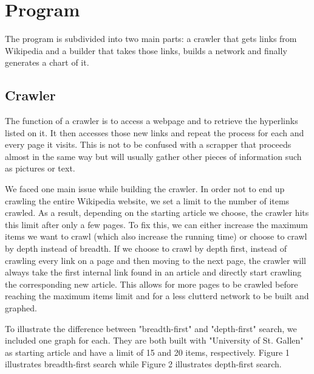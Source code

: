 \documentclass[10pt]{article}
\begin{document}
\section{Program}
The program is subdivided into two main parts: a crawler that gets links from Wikipedia and a builder that takes those links, builds a network and finally generates a chart of it.

	\subsection{Crawler}
	The function of a crawler is to access a webpage and to retrieve the hyperlinks listed on it. It then accesses those new links and repeat the process for each and every page it 	
	visits. This is not to be confused with a scrapper that proceeds almost in the same way but will usually gather other pieces of information such as pictures or text.
	\par \noindent
	We faced one main issue while building the crawler. In order not to end up crawling the entire Wikipedia website, we set a limit to the number of items crawled. As a result, 	
	depending on the starting article we choose, the crawler hits this limit after only a few pages. To fix this, we can either increase the maximum items we want to crawl (which also 
	increase the running time) or choose to crawl by depth instead of breadth. If we choose to crawl by depth first, instead of crawling every link on a page and then moving to the next 	page, the crawler will always take the first internal link found in an article and directly start crawling the corresponding new article. This allows for more pages to be crawled before  
	reaching the maximum items limit and for a less clutterd network to be built and graphed.\par \noindent

	To illustrate the difference between "breadth-first" and "depth-first" search, we included one graph for each. They are both built with "University of St. Gallen" as starting article and 	have a limit of 15 and 20 items, respectively. Figure 1 illustrates breadth-first search while Figure 2 illustrates depth-first search.
	
\end{document}
